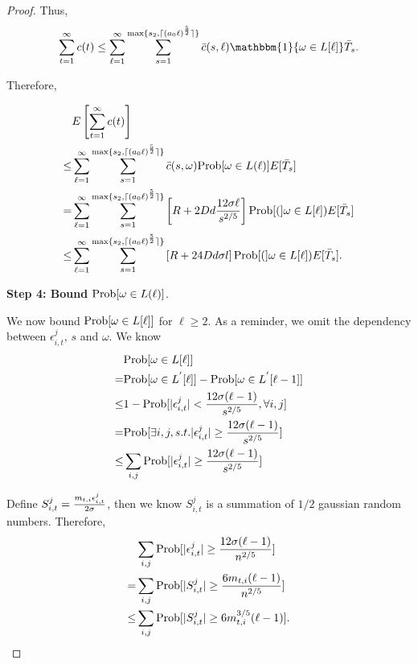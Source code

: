 \begin{proof}
Thus,
\begin{align}
\sum_{t=1}^{\infty}c(t)\leq\sum_{\ell=1}^{\infty}\sum_{s=1}^{\max\{s_2,\lceil (a_0 \ell)^\frac{5}{2} \rceil\}}\bar{c}(s,\ell)\mathbbm{1}\{\omega\in L[\ell]\}\bar{T}_{s}. \nonumber
\end{align}

Therefore,

\begin{align}
&E\left[\sum_{t=1}^{\infty}c(t)\right] \nonumber\\
\leq &\sum_{\ell=1}^{\infty}\sum_{s=1}^{\max\{s_2,\lceil (a_0 \ell)^\frac{5}{2} \rceil\}}\bar{c}(s,\omega)\Prob{\omega \in L(\ell)}E[\bar{T}_{s}] \nonumber \\
=&\sum_{\ell=1}^{\infty}\sum_{s=1}^{\max\{s_2,\lceil (a_0 \ell)^\frac{5}{2} \rceil\}}\left[\MAXR+2\Diam d\frac{12\sigma \ell}{s^{2/5}}\right]\Prob(\omega\in L[\ell])E[\bar{T}_{s}] \nonumber \\
\leq &\sum_{\ell=1}^{\infty}\sum_{s=1}^{\max\{s_2,\lceil (a_0 \ell)^\frac{5}{2} \rceil\}}\left[\MAXR+24\Diam d\sigma l\right]\Prob(\omega\in L[\ell])E[\bar{T}_{s}]. \nonumber
\end{align}

\noindent\textbf{Step 4: Bound $\Prob{\omega\in L(\ell)}$}.

We now bound $\Prob{\omega\in L[\ell]}$ for $\ell\geq 2$. As a reminder, we omit the dependency between $\epsilon_{i,t}^{j}$, $s$ and $\omega$. We know 
\begin{align}
&\Prob{\omega\in L[\ell]} \nonumber \\
=&\Prob{\omega\in L^{'}[\ell]}- \Prob{\omega\in L^{'}[\ell-1]} \nonumber \\
\leq & 1-\Prob{|\epsilon_{i,t}^{j}|<\frac{12\sigma (\ell-1)}{s^{2/5}}, \forall i,j} \nonumber \\
=&\Prob{\exists i,j, s.t. |\epsilon_{i,t}^{j}|\geq \frac{12\sigma (\ell-1)}{s^{2/5}}} \nonumber  \\
\leq &\sum_{i,j}\Prob{|\epsilon_{i,t}^{j}|\geq \frac{12\sigma (\ell-1)}{s^{2/5}}} \nonumber
\end{align}

Define $S_{i,t}^{j}=\frac{m_{t,i}\epsilon_{i,t}^{j}}{2\sigma}$, then we know $S_{i,t}^{j}$ is a summation of $1/2$ gaussian random numbers. Therefore,
\begin{align}
&\sum_{i,j}\Prob{|\epsilon_{i,t}^{j}|\geq \frac{12\sigma(\ell-1)}{n^{2/5}}} \nonumber \\ 
=&\sum_{i,j}\Prob{|S_{i,t}^{j}|\geq \frac{6\NumPull{t}{i}(\ell-1)}{n^{2/5}}} \nonumber \\
\leq &\sum_{i,j}\Prob{|S_{i,t}^{j}|\geq 6\NumPull{t}{i}^{3/5}(\ell-1)}. \nonumber
\end{align}


\end{proof}
